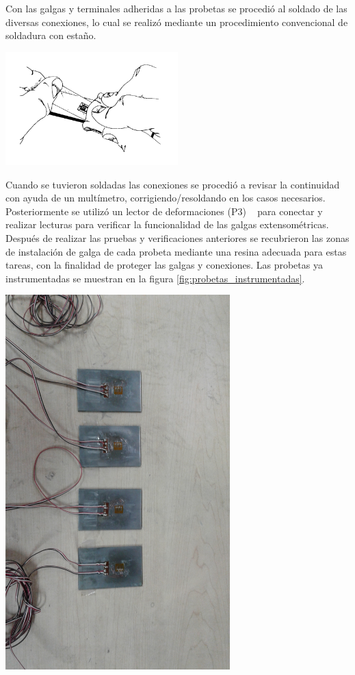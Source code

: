 Con las galgas y terminales adheridas a las probetas se procedió al soldado de las diversas conexiones, lo 
cual se realizó mediante un procedimiento convencional de soldadura con estaño.

\begin{center}
\includegraphics[width=0.5\textwidth]{src/ch3/deslizar_adhesivo.png}
\label{fig:deslizar_adhesivo}
\end{center}

Cuando se tuvieron soldadas las conexiones se procedió a revisar la continuidad con ayuda de un 
multímetro, corrigiendo/resoldando en los casos necesarios. Posteriormente se utilizó un lector 
de deformaciones (P3) ~\cite{p3indicator} para conectar y realizar lecturas para verificar la funcionalidad de las 
galgas extensométricas.\\

Después de realizar las pruebas y verificaciones anteriores se recubrieron las zonas de instalación 
de galga de cada probeta mediante una resina adecuada para estas tareas, con la finalidad de 
proteger las galgas y conexiones. Las probetas ya instrumentadas se muestran en la 
figura \ref{fig:probetas_instrumentadas}.

\begin{center}
\includegraphics[width=0.65\textwidth]{src/ch3/probetas_instrumentadas.jpg}
\label{fig:probetas_instrumentadas}
\end{center}

